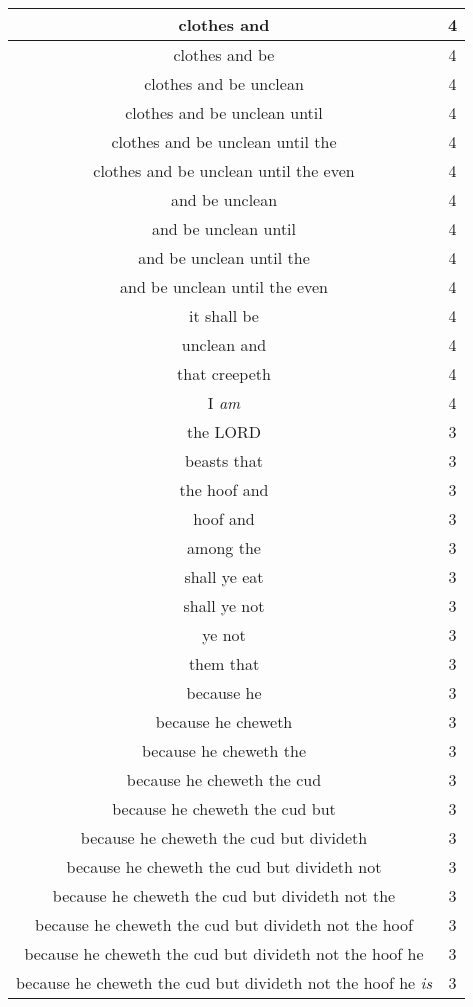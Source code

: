 \begin{center}
\begin{longtable}{|c|c|}
clothes and & 4\\ \hline 
clothes and be & 4\\ \hline 
clothes and be unclean & 4\\ \hline 
clothes and be unclean until & 4\\ \hline 
clothes and be unclean until the & 4\\ \hline 
clothes and be unclean until the even & 4\\ \hline 
and be unclean & 4\\ \hline 
and be unclean until & 4\\ \hline 
and be unclean until the & 4\\ \hline 
and be unclean until the even & 4\\ \hline 
it shall be & 4\\ \hline 
unclean and & 4\\ \hline 
that creepeth & 4\\ \hline 
I \emph{am} & 4\\ \hline 
the LORD & 3\\ \hline 
beasts that & 3\\ \hline 
the hoof and & 3\\ \hline 
hoof and & 3\\ \hline 
among the & 3\\ \hline 
shall ye eat & 3\\ \hline 
shall ye not & 3\\ \hline 
ye not & 3\\ \hline 
them that & 3\\ \hline 
because he & 3\\ \hline 
because he cheweth & 3\\ \hline 
because he cheweth the & 3\\ \hline 
because he cheweth the cud & 3\\ \hline 
because he cheweth the cud but & 3\\ \hline 
because he cheweth the cud but divideth & 3\\ \hline 
because he cheweth the cud but divideth not & 3\\ \hline 
because he cheweth the cud but divideth not the & 3\\ \hline 
because he cheweth the cud but divideth not the hoof & 3\\ \hline 
because he cheweth the cud but divideth not the hoof he & 3\\ \hline 
because he cheweth the cud but divideth not the hoof he \emph{is} & 3\\ \hline 

\end{longtable}
\end{center}
